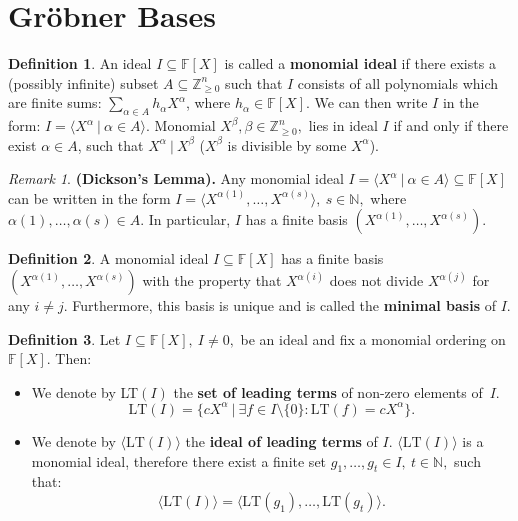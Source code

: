 \documentclass[thesis=M,english]{FITthesis}[2012/10/20]
\theoremstyle{remark}
\newtheorem*{RM}{Remark}
\theoremstyle{definition}
\newtheorem{DF}{Definition}[section]
\begin{document}
\section{Gröbner Bases}
\begin{DF}
An ideal $I \subseteq \mathbb{F}[X]$ is called a \textbf{monomial ideal} if there exists a (possibly infinite) subset $A \subseteq \mathbb{Z}_{\geq 0}^n$ such that $I$ consists of all polynomials which are finite sums: $\sum_{\alpha \in A} h_\alpha X^\alpha$, where $h_\alpha \in \mathbb{F}[X].$ We can then write $I$ in the form: $I = \langle X^\alpha \ |\ \alpha \in A\rangle.$ Monomial $X^\beta, \beta \in \mathbb{Z}_{\geq 0}^n,$ lies in ideal $I$ if and only if there exist $\alpha \in A$, such that $X^\alpha \ |\ X^\beta$ ($X^\beta$ is divisible by some $X^\alpha$). 
\end{DF}
\begin{RM}
\textbf{(Dickson's Lemma).} Any monomial ideal $I = \langle X^\alpha \ |\ \alpha \in A\rangle \subseteq \mathbb{F}[X]$ can be written in the form $I = \langle X^{\alpha(1)}, \ldots, X^{\alpha(s)}\rangle,\ s \in \mathbb{N},$ where $\alpha(1), \ldots, \alpha(s) \in A$. In particular, $I$ has a finite basis $(X^{\alpha(1)}, \ldots, X^{\alpha(s)})$.
\end{RM}
\begin{DF}
A monomial ideal $I \subseteq \mathbb{F}[X]$ has a finite basis $(X^{\alpha(1)}, \ldots, X^{\alpha(s)})$ with the property that $X^{\alpha(i)}$ does not divide $X^{\alpha(j)}$ for any $i \neq j$. Furthermore, this basis is unique and is called the \textbf{minimal basis} of $I$.
\end{DF}
\begin{DF}
Let $I \subseteq \mathbb{F}[X],\ I \neq {0},$ be an ideal and fix a monomial ordering on $\mathbb{F}[X]$.  Then:
\begin{itemize}
\item We denote by LT$(I)$ the \textbf{set of leading terms} of non-zero elements of~$I$.
$$
\text{LT}(I) = \{ cX^\alpha \ |\ \exists f \in I \setminus \{0\}: \text{LT}(f)= cX^\alpha \}.
$$
\item We denote by $\langle \text{LT}(I) \rangle$ the \textbf{ideal of leading terms} of $I$. $\langle \text{LT}(I) \rangle$ is a monomial ideal, therefore there exist a finite set $g_1,\ldots, g_t \in I,\ t \in \mathbb{N},$ such that:
$$
\langle \text{LT}(I) \rangle = \langle \text{LT}(g_1), \ldots, \text{LT}(g_t) \rangle.
$$
\end{itemize}
\end{DF}
\end{document}
